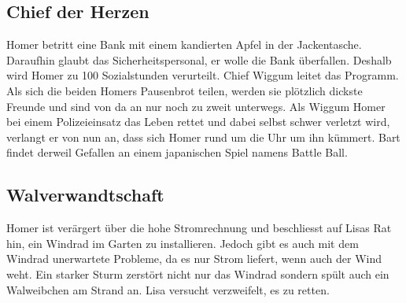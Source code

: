 

\subsection{Chief der Herzen}\label{MABF09}
Homer betritt eine Bank mit einem kandierten Apfel in der Jackentasche. Daraufhin glaubt das Sicherheitspersonal, er wolle die Bank überfallen. Deshalb wird Homer zu 100 Sozialstunden verurteilt. Chief Wiggum leitet das Programm. Als sich die beiden Homers Pausenbrot teilen, werden sie plötzlich dickste Freunde und sind von da an nur noch zu zweit unterwegs. Als Wiggum Homer bei einem Polizeieinsatz das Leben rettet und dabei selbst schwer verletzt wird, verlangt er von nun an, dass sich Homer rund um die Uhr um ihn kümmert. Bart findet derweil Gefallen an einem japanischen Spiel namens Battle Ball.


\subsection{Walverwandtschaft}
Homer ist verärgert über die hohe Stromrechnung und beschliesst auf Lisas Rat hin, ein Windrad im Garten zu installieren. Jedoch gibt es auch mit dem Windrad unerwartete Probleme, da es nur Strom liefert, wenn auch der Wind weht. Ein starker Sturm zerstört nicht nur das Windrad sondern spült auch ein Walweibchen am Strand an. Lisa versucht verzweifelt, es zu retten.

